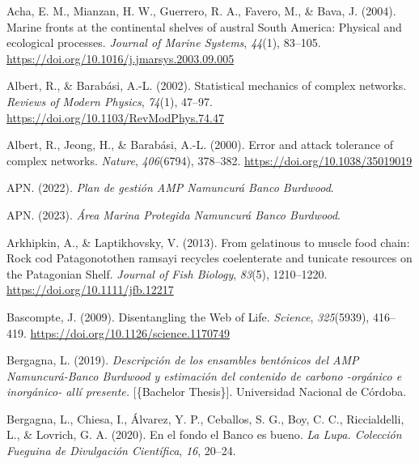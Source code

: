 \documentclass[preprint, 3p,
authoryear]{elsarticle} %
\newlength{\cslhangindent}
\newlength{\cslentryspacingunit} %
\newenvironment{CSLReferences}[2] %
 {%
  \setlength{\parindent}{0pt}
  \ifodd #1
  \let\oldpar\par
  \def\par{\hangindent=\cslhangindent\oldpar}
  \fi
  \setlength{\parskip}{#2\cslentryspacingunit}
 }%
 {}
\begin{document}
\hypertarget{refs}{}
\begin{CSLReferences}{1}{0}
\leavevmode{}%
Acha, E. M., Mianzan, H. W., Guerrero, R. A., Favero, M., \& Bava, J.
(2004). Marine fronts at the continental shelves of austral {South
America}: {Physical} and ecological processes. \emph{Journal of Marine
Systems}, \emph{44}(1), 83--105.
\url{https://doi.org/10.1016/j.jmarsys.2003.09.005}

\leavevmode{}%
Albert, R., \& Barabási, A.-L. (2002). Statistical mechanics of complex
networks. \emph{Reviews of Modern Physics}, \emph{74}(1), 47--97.
\url{https://doi.org/10.1103/RevModPhys.74.47}

\leavevmode{}%
Albert, R., Jeong, H., \& Barabási, A.-L. (2000). Error and attack
tolerance of complex networks. \emph{Nature}, \emph{406}(6794),
378--382. \url{https://doi.org/10.1038/35019019}

\leavevmode{}%
APN. (2022). \emph{Plan de gestión {AMP Namuncurá Banco Burdwood}}.

\leavevmode{}%
APN. (2023). \emph{Área {Marina Protegida Namuncurá Banco Burdwood}}.

\leavevmode{}%
Arkhipkin, A., \& Laptikhovsky, V. (2013). From gelatinous to muscle
food chain: Rock cod {Patagonotothen} ramsayi recycles coelenterate and
tunicate resources on the {Patagonian Shelf}. \emph{Journal of Fish
Biology}, \emph{83}(5), 1210--1220.
\url{https://doi.org/10.1111/jfb.12217}

\leavevmode{}%
Bascompte, J. (2009). Disentangling the {Web} of {Life}. \emph{Science},
\emph{325}(5939), 416--419.
\url{https://doi.org/10.1126/science.1170749}

\leavevmode{}%
Bergagna, L. (2019). \emph{{Descripción de los ensambles bentónicos del
AMP Namuncurá-Banco Burdwood y estimación del contenido de carbono
-orgánico e inorgánico- allí presente.}} {[}\{Bachelor Thesis\}{]}.
Universidad Nacional de Córdoba.

\leavevmode{}%
Bergagna, L., Chiesa, I., Álvarez, Y. P., Ceballos, S. G., Boy, C. C.,
Riccialdelli, L., \& Lovrich, G. A. (2020). {En el fondo el Banco es
bueno}. \emph{La Lupa. Colección Fueguina de Divulgación Científica},
\emph{16}, 20--24.


\end{CSLReferences}
\end{document}
